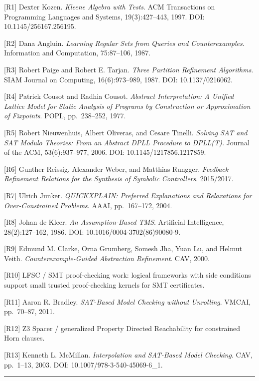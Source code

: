 \documentclass[
]{article}
\begin{document}
{[}R1{]} Dexter Kozen. \emph{Kleene Algebra with Tests}. ACM
Transactions on Programming Languages and Systems, 19(3):427--443, 1997.
DOI: 10.1145/256167.256195.

{[}R2{]} Dana Angluin. \emph{Learning Regular Sets from Queries and
Counterexamples}. Information and Computation, 75:87--106, 1987.

{[}R3{]} Robert Paige and Robert E. Tarjan. \emph{Three Partition
Refinement Algorithms}. SIAM Journal on Computing, 16(6):973--989, 1987.
DOI: 10.1137/0216062.

{[}R4{]} Patrick Cousot and Radhia Cousot. \emph{Abstract
Interpretation: A Unified Lattice Model for Static Analysis of Programs
by Construction or Approximation of Fixpoints}. POPL, pp.~238--252,
1977.

{[}R5{]} Robert Nieuwenhuis, Albert Oliveras, and Cesare Tinelli.
\emph{Solving SAT and SAT Modulo Theories: From an Abstract DPLL
Procedure to DPLL(T).} Journal of the ACM, 53(6):937--977, 2006. DOI:
10.1145/1217856.1217859.

{[}R6{]} Gunther Reissig, Alexander Weber, and Matthias Rungger.
\emph{Feedback Refinement Relations for the Synthesis of Symbolic
Controllers}. 2015/2017.

{[}R7{]} Ulrich Junker. \emph{QUICKXPLAIN: Preferred Explanations and
Relaxations for Over-Constrained Problems}. AAAI, pp.~167--172, 2004.

{[}R8{]} Johan de Kleer. \emph{An Assumption-Based TMS}. Artificial
Intelligence, 28(2):127--162, 1986. DOI: 10.1016/0004-3702(86)90080-9.

{[}R9{]} Edmund M. Clarke, Orna Grumberg, Somesh Jha, Yuan Lu, and
Helmut Veith. \emph{Counterexample-Guided Abstraction Refinement}. CAV,
2000.

{[}R10{]} LFSC / SMT proof-checking work: logical frameworks with side
conditions support small trusted proof-checking kernels for SMT
certificates.

{[}R11{]} Aaron R. Bradley. \emph{SAT-Based Model Checking without
Unrolling}. VMCAI, pp.~70--87, 2011.

{[}R12{]} Z3 Spacer / generalized Property Directed Reachability for
constrained Horn clauses.

{[}R13{]} Kenneth L. McMillan. \emph{Interpolation and SAT-Based Model
Checking}. CAV, pp.~1--13, 2003. DOI: 10.1007/978-3-540-45069-6\_1.

\begin{center}\rule{0.5\linewidth}{0.5pt}\end{center}
\end{document}
